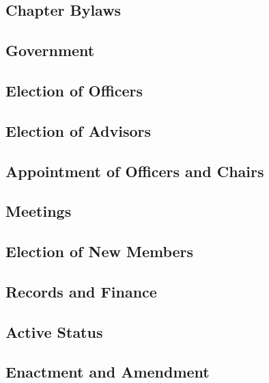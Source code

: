 \documentclass[bylaws,final,10pt,withoutoptional,withoutpreface]{../bylaws}
\begin{document}

\newcommand{\removed}[1]{\cbstart\removedfragile{#1}\cbend{}}
\newcommand{\removedfragile}[1]{{\color{red}{#1}}{}}
\newcommand{\added}[1]{\cbstart\addedfragile{#1}\cbend{}}
\newcommand{\addedfragile}[1]{{\color{green!50!black}{#1}}{}}
\newcommand{\changed}[2]{\added{#1}\removed{#2}}



\frontmatter
\maketitle
%

%
\tableofcontents\newpage
\mainmatter
\begin{optionalpart}
\part{Chapter Bylaws}
\end{optionalpart}

\chapter{Government}\label{sec:gov}



\chapter{Election of Officers}\label{sec:oficElec}


\chapter{Election of Advisors}\label{sec:advElec}




\chapter{Appointment of Officers and Chairs}\label{sec:appointmentofficers}


\chapter{Meetings}\label{sec:meetings}


\chapter{Election of New Members}\label{sec:newElec}



\chapter{Records and Finance}\label{sec:records}



\chapter{Active Status}\label{sec:activeStatus}



\chapter{Enactment and Amendment}\label{sec:amendment}



\appendix





\end{document}
